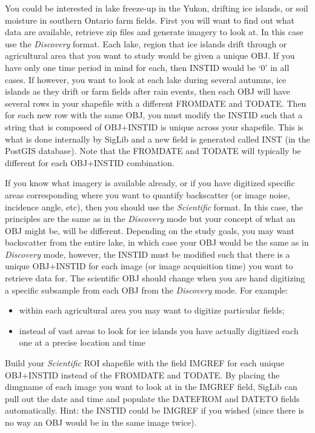 \documentclass[letterpaper,10pt,openany,oneside]{sphinxmanual}
\begin{document}
You could be interested in lake freeze-up in the Yukon, drifting ice
islands, or soil moisture in southern Ontario farm fields. First you
will want to find out what data are available, retrieve zip files and
generate imagery to look at. In this case use the \emph{Discovery} format.
Each lake, region that ice islands drift through or agricultural area
that you want to study would be given a unique OBJ. If you have only one
time period in mind for each, then INSTID would be `0' in all cases. If
however, you want to look at each lake during several autumns, ice
islands as they drift or farm fields after rain events, then each OBJ
will have several rows in your shapefile with a different FROMDATE and
TODATE. Then for each new row with the same OBJ, you must modify the
INSTID such that a string that is composed of OBJ+INSTID is unique
across your shapefile. This is what is done internally by SigLib and a
new field is generated called INST (in the PostGIS database). Note that
the FROMDATE and TODATE will typically be different for each OBJ+INSTID
combination.

If you know what imagery is available already, or if you have digitized
specific areas corresponding where you want to quantify backscatter (or
image noise, incidence angle, etc), then you should use the \emph{Scientific}
format. In this case, the principles are the same as in the \emph{Discovery}
mode but your concept of what an OBJ might be, will be different.
Depending on the study goals, you may want backscatter from the entire
lake, in which case your OBJ would be the same as in \emph{Discovery} mode,
however, the INSTID must be modified such that there is a unique
OBJ+INSTID for each image (or image acquisition time) you want to
retrieve data for. The scientific OBJ should change when you are hand
digitizing a specific subsample from each OBJ from the \emph{Discovery} mode.
For example:
\begin{itemize}
\item {} 
within each agricultural area you may want to digitize particular
fields;

\item {} 
instead of vast areas to look for ice islands you have actually
digitized each one at a precise location and time

\end{itemize}

Build your \emph{Scientific} ROI shapefile with the field IMGREF for each
unique OBJ+INSTID instead of the FROMDATE and TODATE. By placing the
dimgname of each image you want to look at in the IMGREF field, SigLib
can pull out the date and time and populate the DATEFROM and DATETO
fields automatically. Hint: the INSTID could be IMGREF if you wished
(since there is no way an OBJ would be in the same image twice).
\end{document}
